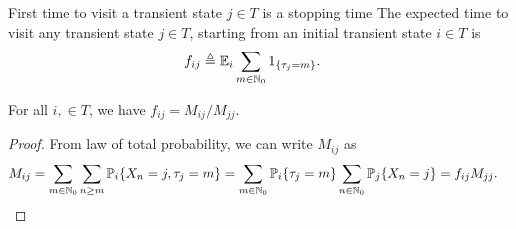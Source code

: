 \documentclass[a4paper,10pt,english]{article}
\begin{document}
First time to visit a transient state $j \in T$ is a stopping time 
The expected time to visit any transient state $j \in T$, starting from an initial transient state $i \in T$ is  
\begin{align*}
f_{ij} &\triangleq \mathbb{E}_i\sum_{m \in \mathbb{N}_0}1_{\{\tau_j = m\}}.
\end{align*}
\begin{lem} 
For all $i, \in T$, we have $f_{ij} = {M_{ij}}/{M_{jj}}$.
\end{lem}
\begin{proof} 
From law of total probability, we can write $M_{ij}$ as 
\begin{align*}
M_{ij} &= \sum_{m \in \mathbb{N}_0}\sum_{n \geq m}\mathbb{P}_i\{X_n = j, \tau_j = m\} = \sum_{m \in \mathbb{N}_0}\mathbb{P}_i\{\tau_j = m\}\sum_{n \in \mathbb{N}_0}\mathbb{P}_j\{X_n = j\} = f_{ij}M_{jj}.
\end{align*}
\end{proof}
\end{document}
